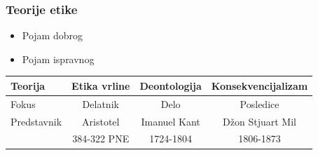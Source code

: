\documentclass[pdf]{beamer}
\begin{document}
\begin{frame}
\frametitle{Teorije etike}

\begin{itemize}
\item{Pojam dobrog}
\item{Pojam ispravnog}
\end{itemize}

\begin{table}
\begin{center}
\begin{tabular}{|l|c|c|c|} \hline
Teorija & Etika vrline & Deontologija & Konsekvencijalizam\\ \hline
Fokus & Delatnik & Delo & Posledice\\ \hline
Predstavnik & Aristotel & Imanuel Kant & Džon Stjuart Mil\\
& 384-322 PNE & 1724-1804 & 1806-1873\\ 

\end{tabular}
\end{center}
\end{table}
\end{frame}
\end{document}
